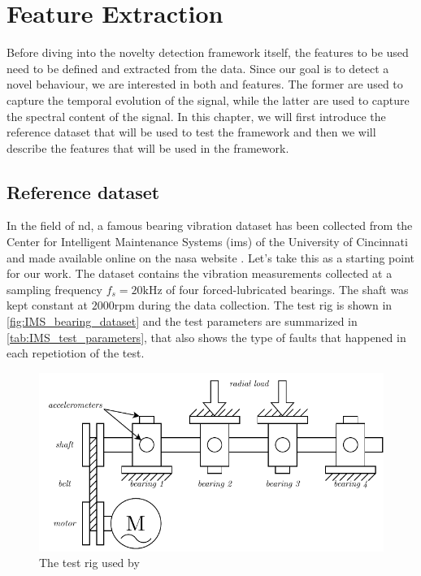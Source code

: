 \chapter{Feature Extraction}
\label{ch:FeatureExtraction}

Before diving into the novelty detection framework itself, the features to be used need to be defined and extracted from the data. Since our goal is to detect a novel behaviour, we are interested in both  and  features. The former are used to capture the temporal evolution of the signal, while the latter are used to capture the spectral content of the signal. In this chapter, we will first introduce the reference dataset that will be used to test the framework and then we will describe the features that will be used in the framework.

\section{Reference dataset}
In the field of \gls{nd}, a famous bearing vibration dataset has been collected from the Center for Intelligent Maintenance Systems (\gls{ims}) of the University of Cincinnati and made available online on the \gls{nasa} website \cite{lee2007bearingdataset}. 
Let's take this as a starting point for our work. The dataset contains the vibration measurements collected at a sampling frequency $f_s=20\si{\kHz}$ of four forced-lubricated bearings. The shaft was kept constant at $2000$rpm during the data collection. The test rig is shown in \autoref{fig:IMS_bearing_dataset} and the test parameters are summarized in \autoref{tab:IMS_test_parameters}, that also shows the type of faults that happened in each repetiotion of the test.

\begin{figure}
    \centering
    \includegraphics[scale=1]{images/FeatureExtraction/testrig.pdf}
    \caption{The test rig used by \cite{lee2007bearingdataset}}
    \label{fig:IMS_bearing_dataset}
\end{figure}

